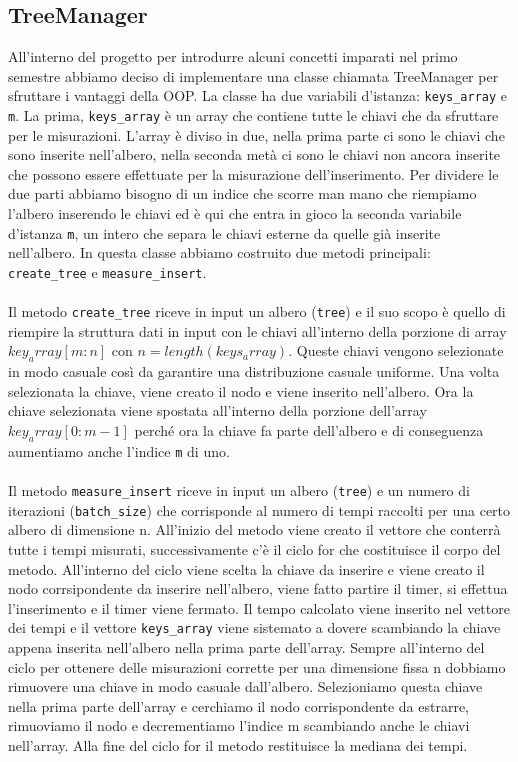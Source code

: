\documentclass{article}
\begin{document}
\subsection{TreeManager}
All'interno del progetto per introdurre alcuni concetti imparati nel primo semestre abbiamo deciso di implementare una classe chiamata TreeManager per sfruttare i vantaggi della OOP. La classe ha due variabili d'istanza: \verb|keys_array| e \verb|m|. La prima, \verb|keys_array| è un array che contiene tutte le chiavi che da sfruttare per le misurazioni. L'array è diviso in due, nella prima parte ci sono le chiavi che sono inserite nell'albero, nella seconda metà ci sono le chiavi non ancora inserite che possono essere effettuate per la misurazione dell'inserimento. Per dividere le due parti abbiamo bisogno di un indice che scorre man mano che riempiamo l'albero inserendo le chiavi ed è qui che entra in gioco la seconda variabile d'istanza \verb|m|, un intero che separa le chiavi esterne da quelle già inserite nell'albero.
In questa classe abbiamo costruito due metodi principali: \verb|create_tree| e \verb|measure_insert|.\\\\
Il metodo \verb|create_tree| riceve in input un albero (\verb|tree|) e il suo scopo è quello di riempire la struttura dati in input con le chiavi all'interno della porzione di array $key_array[m:n]$ con $n = length(keys_array)$. Queste chiavi vengono selezionate in modo casuale così da garantire una distribuzione casuale uniforme. Una volta selezionata la chiave, viene creato il nodo e viene inserito nell'albero. Ora la chiave selezionata viene spostata all'interno della porzione dell'array $key_array[0:m-1]$ perché ora la chiave fa parte dell'albero e di conseguenza aumentiamo anche l'indice \verb|m| di uno.\\\\
Il metodo \verb|measure_insert| riceve in input un albero (\verb|tree|) e un numero di iterazioni (\verb|batch_size|) che corrisponde al numero di tempi raccolti per una certo albero di dimensione n. All'inizio del metodo viene creato il vettore che conterrà tutte i tempi misurati, successivamente c'è il ciclo for che costituisce il corpo del metodo. All'interno del ciclo viene scelta la chiave da inserire e viene creato il nodo corrsipondente da inserire nell'albero, viene fatto partire il timer, si effettua l'inserimento e il timer viene fermato. Il tempo calcolato viene inserito nel vettore dei tempi e il vettore \verb|keys_array| viene sistemato a dovere scambiando la chiave appena inserita nell'albero nella prima parte dell'array. Sempre all'interno del ciclo per ottenere delle misurazioni corrette per una dimensione fissa n dobbiamo rimuovere una chiave in modo casuale dall'albero. Selezioniamo questa chiave nella prima parte dell'array e cerchiamo il nodo corrispondente da estrarre, rimuoviamo il nodo e decrementiamo l'indice m scambiando anche le chiavi nell'array. Alla fine del ciclo for il metodo restituisce la mediana dei tempi.
\end{document}
